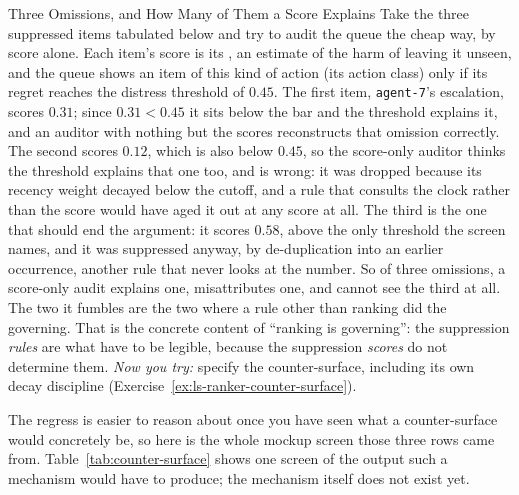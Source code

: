 \documentclass[11pt,a4paper]{article}
\theoremstyle{definition}
\theoremstyle{plain}
\begin{document}
\begin{pdexample}{Three Omissions, and How Many of Them a Score Explains}
\setlength{\parskip}{4pt plus 1pt}
Take the three suppressed items tabulated below and try to audit the queue the cheap way, by score alone. Each item's score is its , an estimate of the harm of leaving it unseen, and the queue shows an item of this kind of action (its action class) only if its regret reaches the distress threshold of $0.45$.
The first item, \texttt{agent-7}'s escalation, scores $0.31$; since $0.31<0.45$ it sits below the bar and the threshold explains it, and an auditor with nothing but the scores reconstructs that omission correctly.
The second scores $0.12$, which is also below $0.45$, so the score-only auditor thinks the threshold explains that one too, and is wrong: it was dropped because its recency weight decayed below the cutoff, and a rule that consults the clock rather than the score would have aged it out at any score at all.
The third is the one that should end the argument: it scores $0.58$, above the only threshold the screen names, and it was suppressed anyway, by de-duplication into an earlier occurrence, another rule that never looks at the number.
So of three omissions, a score-only audit explains one, misattributes one, and cannot see the third at all. The two it fumbles are the two where a rule other than ranking did the governing. That is the concrete content of ``ranking is governing'': the suppression \emph{rules} are what have to be legible, because the suppression \emph{scores} do not determine them.
\emph{Now you try:} specify the counter-surface, including its own decay discipline (Exercise~\ref{ex:ls-ranker-counter-surface}).
\end{pdexample}
The regress is easier to reason about once you have seen what a counter-surface would
concretely be, so here is the whole mockup screen those three rows came from.
Table~\ref{tab:counter-surface} shows one screen of the output such a mechanism
would have to produce; the mechanism itself does not exist yet.
\end{document}
